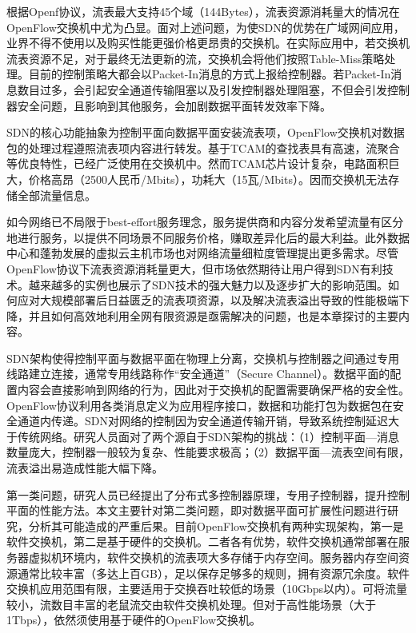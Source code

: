 根据Openf协议，流表最大支持45个域（144Bytes），流表资源消耗量大的情况在OpenFlow交换机中尤为凸显。面对上述问题，为使SDN的优势在广域网间应用，业界不得不使用以及购买性能更强价格更昂贵的交换机。在实际应用中，若交换机流表资源不足，对于最终无法更新的流，交换机会将他们按照Table-Miss策略处理。目前的控制策略大都会以Packet-In消息的方式上报给控制器。若Packet-In消息数目过多，会引起安全通道传输阻塞以及引发控制器处理阻塞，不但会引发控制器安全问题，且影响到其他服务，会加剧数据平面转发效率下降。


SDN的核心功能抽象为控制平面向数据平面安装流表项，OpenFlow交换机对数据包的处理过程遵照流表项内容进行转发。基于TCAM的查找表具有高速，流聚合等优良特性，已经广泛使用在交换机中。然而TCAM芯片设计复杂，电路面积巨大，价格高昂（2500人民币/Mbits），功耗大（15瓦/Mbits）。因而交换机无法存储全部流量信息。

如今网络已不局限于best-effort服务理念，服务提供商和内容分发希望流量有区分地进行服务，以提供不同场景不同服务价格，赚取差异化后的最大利益。此外数据中心和蓬勃发展的虚拟云主机市场也对网络流量细粒度管理提出更多需求。尽管OpenFlow协议下流表资源消耗量更大，但市场依然期待让用户得到SDN有利技术。越来越多的实例也展示了SDN技术的强大魅力以及逐步扩大的影响范围。如何应对大规模部署后日益匮乏的流表项资源，以及解决流表溢出导致的性能极端下降，并且如何高效地利用全网有限资源是亟需解决的问题，也是本章探讨的主要内容。


\label{chap532}

SDN架构使得控制平面与数据平面在物理上分离，交换机与控制器之间通过专用线路建立连接，通常专用线路称作“安全通道”（Secure Channel）。数据平面的配置内容会直接影响到网络的行为，因此对于交换机的配置需要确保严格的安全性。OpenFlow协议利用各类消息定义为应用程序接口，数据和功能打包为数据包在安全通道内传递。SDN对网络的控制因为安全通道传输开销，导致系统控制延迟大于传统网络。研究人员面对了两个源自于SDN架构的挑战：（1）控制平面---消息数量庞大，控制器一般较为复杂、性能要求极高；（2）数据平面---流表空间有限，流表溢出易造成性能大幅下降。

第一类问题，研究人员已经提出了分布式多控制器原理，专用子控制器，提升控制平面的性能方法。本文主要针对第二类问题，即对数据平面可扩展性问题进行研究，分析其可能造成的严重后果。目前OpenFlow交换机有两种实现架构，第一是软件交换机，第二是基于硬件的交换机。二者各有优势，软件交换机通常部署在服务器虚拟机环境内，软件交换机的流表项大多存储于内存空间。服务器内存空间资源通常比较丰富（多达上百GB），足以保存足够多的规则，拥有资源冗余度。软件交换机应用范围有限，主要适用于交换吞吐较低的场景（10Gbps以内）。可将流量较小，流数目丰富的老鼠流交由软件交换机处理。但对于高性能场景（大于1Tbps），依然须使用基于硬件的OpenFlow交换机。

